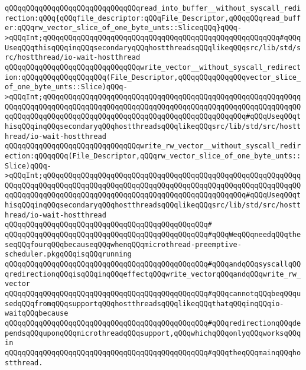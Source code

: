 \verb|qQQqqQQqqQQqqQQqqQQqqQQqqQQqqQQqread_into_buffer__without_syscall_redirection:qQQq{qQQqfile_descriptor:qQQqFile_Descriptor,qQQqqQQqread_buffer:qQQqrw_vector_slice_of_one_byte_unts::SliceqQQq}qQQq->qQQqInt;qQQqqQQqqQQqqQQqqQQqqQQqqQQqqQQqqQQqqQQqqQQqqQQqqQQqqQQq#qQQqUseqQQqthisqQQqinqQQqsecondaryqQQqhostthreadsqQQqlikeqQQqsrc/lib/std/src/hostthread/io-wait-hostthread|\newline
\newline
\verb|qQQqqQQqqQQqqQQqqQQqqQQqqQQqqQQqwrite_vector__without_syscall_redirection:qQQqqQQqqQQqqQQqqQQq(File_Descriptor,qQQqqQQqqQQqqQQqvector_slice_of_one_byte_unts::Slice)qQQq->qQQqInt;qQQqqQQqqQQqqQQqqQQqqQQqqQQqqQQqqQQqqQQqqQQqqQQqqQQqqQQqqQQqqQQqqQQqqQQqqQQqqQQqqQQqqQQqqQQqqQQqqQQqqQQqqQQqqQQqqQQqqQQqqQQqqQQqqQQqqQQqqQQqqQQqqQQqqQQqqQQqqQQqqQQqqQQqqQQqqQQqqQQqqQQqqQQq#qQQqUseqQQqthisqQQqinqQQqsecondaryqQQqhostthreadsqQQqlikeqQQqsrc/lib/std/src/hostthread/io-wait-hostthread|\newline
\verb|qQQqqQQqqQQqqQQqqQQqqQQqqQQqqQQqwrite_rw_vector__without_syscall_redirection:qQQqqQQq(File_Descriptor,qQQqrw_vector_slice_of_one_byte_unts::Slice)qQQq->qQQqInt;qQQqqQQqqQQqqQQqqQQqqQQqqQQqqQQqqQQqqQQqqQQqqQQqqQQqqQQqqQQqqQQqqQQqqQQqqQQqqQQqqQQqqQQqqQQqqQQqqQQqqQQqqQQqqQQqqQQqqQQqqQQqqQQqqQQqqQQqqQQqqQQqqQQqqQQqqQQqqQQqqQQqqQQqqQQqqQQqqQQqqQQqqQQq#qQQqUseqQQqthisqQQqinqQQqsecondaryqQQqhostthreadsqQQqlikeqQQqsrc/lib/std/src/hostthread/io-wait-hostthread|\newline
\verb|qQQqqQQqqQQqqQQqqQQqqQQqqQQqqQQqqQQqqQQqqQQqqQQq#|\newline
\verb|qQQqqQQqqQQqqQQqqQQqqQQqqQQqqQQqqQQqqQQqqQQqqQQq#qQQqWeqQQqneedqQQqtheseqQQqfourqQQqbecauseqQQqwhenqQQqmicrothread-preemptive-scheduler.pkgqQQqisqQQqrunning|\newline
\verb|qQQqqQQqqQQqqQQqqQQqqQQqqQQqqQQqqQQqqQQqqQQqqQQq#qQQqandqQQqsyscallqQQqredirectionqQQqisqQQqinqQQqeffectqQQqwrite_vectorqQQqandqQQqwrite_rw_vector|\newline
\verb|qQQqqQQqqQQqqQQqqQQqqQQqqQQqqQQqqQQqqQQqqQQqqQQq#qQQqcannotqQQqbeqQQqusedqQQqfromqQQqsupportqQQqhostthreadsqQQqlikeqQQqthatqQQqinqQQqio-waitqQQqbecause|\newline
\verb|qQQqqQQqqQQqqQQqqQQqqQQqqQQqqQQqqQQqqQQqqQQqqQQq#qQQqredirectionqQQqdependsqQQquponqQQqmicrothreadqQQqsupport,qQQqwhichqQQqonlyqQQqworksqQQqin|\newline
\verb|qQQqqQQqqQQqqQQqqQQqqQQqqQQqqQQqqQQqqQQqqQQqqQQq#qQQqtheqQQqmainqQQqhostthread.|\newline
\newline
